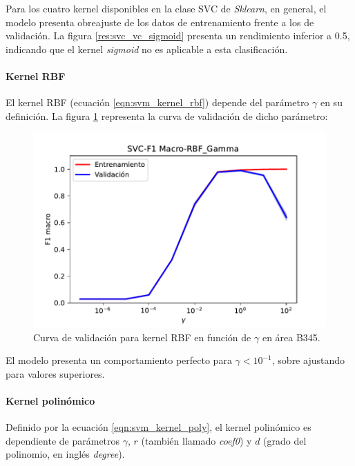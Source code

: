 Para los cuatro kernel disponibles en la clase SVC de \textit{Sklearn}, en general, el modelo presenta obreajuste de los datos de entrenamiento frente a los de validación. La figura \ref{res:svc_vc_sigmoid} presenta un rendimiento inferior a 0.5, indicando que el kernel \textit{sigmoid} no es aplicable a esta clasificación.

\paragraph{Kernel RBF}

El kernel RBF (ecuación \ref{eqn:svm_kernel_rbf}) depende del parámetro $\gamma$ en su definición. La figura \ref{res:svc_vc_rbf_gamma_b345} representa la curva de validación de dicho parámetro:

\begin{figure}[H]
	\centering
	\captionsetup{justification=centering}
	\includegraphics[width=\textwidth]{imagenes/resultados/svm/curvas_validacion/b345/SVC-F1 Macro-RBF_Gamma.pdf}
	\caption{Curva de validación para kernel RBF en función de $\gamma$ en área B345.}
	\label{res:svc_vc_rbf_gamma_b345}
\end{figure}

El modelo presenta un comportamiento perfecto para $\gamma<10^{-1}$, sobre ajustando para valores superiores.

\paragraph{Kernel polinómico}

Definido por la ecuación \ref{eqn:svm_kernel_poly}, el kernel polinómico es dependiente de parámetros $\gamma$, $r$ (también llamado \textit{coef0}) y $d$ (grado del polinomio, en inglés \textit{degree}).

